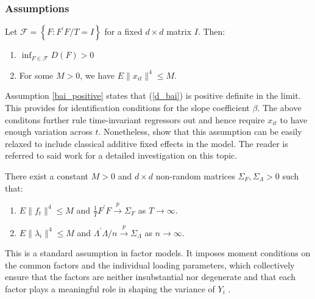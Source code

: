 \subsubsection{Assumptions}\label{assumptions_bai}


\setcounter{assumption}{0}
\renewcommand{\theassumption}{\Alph{assumption}}



\begin{assumption}\label{bai_positive}
    Let \(\mathcal{F}=\left\{F: F^{\prime} F / T=I\right\}\) for a fixed \(d \times d\) matrix \(I\). Then:
    
    \begin{enumerate}[label = (\roman*)]
        \item \(\inf _{F \in \mathcal{F}} D(F)>0\)
        \item For some \(M > 0\), we have \(E\|x_{it}\|^4 \leq M\).
    \end{enumerate} 
\end{assumption}

Assumption \ref{bai_positive} states that (\ref{d_bai}) is positive definite in the limit. This provides for identification conditions for the slope coefficient $\beta$.  The above conditons further rule time-invariant regressors out and hence require $x_{it}$ to have enough variation across $t$. Nonetheless, \citet{bai2009panel} show that this assumption can be easily relaxed to include classical additive fixed effects in the model. The reader is referred to said work for a detailed investigation on this topic. 


\begin{assumption}\label{stationary_factors}
    There exist a constant \(M > 0\) and \(d \times d\) non-random matrices \(\Sigma_F, \Sigma_{\Lambda} > 0\) such that:
    \begin{enumerate}[label = (\roman*)]
        \item \(E\|f_t\|^4 \leq M\) and \(\frac{1}{T}  F^{\prime} F \stackrel{p}{\longrightarrow} \Sigma_F\) as \(T \rightarrow \infty\).
        \item \(E\|\lambda_i\|^4 \leq M\) and \(\Lambda^{\prime} \Lambda /n  \stackrel{p}{\longrightarrow} \Sigma_{\Lambda}\) as \(n \rightarrow \infty\).
    \end{enumerate}
\end{assumption}


This is a standard assumption in factor models. It imposes moment conditions on the common factors and the individual loading parameters, which collectively ensure that the factors are neither insubstantial nor degenerate and that each factor plays a meaningful role in shaping the variance of $Y_i$ \citep{bai2002determining, bai2003inferential, bai2008large, bai2009panel}.

